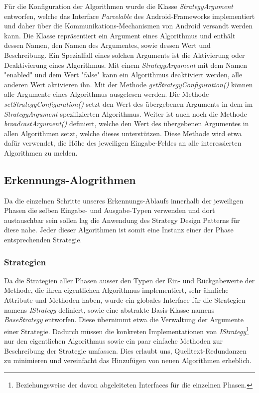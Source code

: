 \label{lbl_be_enable}Für die Konfiguration der Algorithmen wurde die Klasse \emph{StrategyArgument} entworfen, welche das Interface \emph{Parcelable} des Android-Frameworks implementiert und daher über die Kommunikations-Mechanismen von Android versandt werden kann. Die Klasse repräsentiert ein Argument eines Algorithmus und enthält dessen Namen, den Namen des Argumentes, sowie dessen Wert und Beschreibung. Ein Spezialfall eines solchen Arguments ist die Aktivierung oder Deaktivierung eines Algorithmus. Mit einem \emph{StrategyArgument} mit dem Namen "enabled" und dem Wert "false" kann ein Algorithmus deaktiviert werden, alle anderen Wert aktivieren ihn. Mit der Methode \emph{getStrategyConfiguration()} können alle Argumente eines Algorithmus ausgelesen werden. Die Methode \emph{setStrategyConfiguration()} setzt den Wert des übergebenen Arguments in dem im \emph{StrategyArgument} spezifizierten Algorithmus. Weiter ist auch noch die Methode \emph{broadcastArgument()} definiert, welche den Wert des übergebenen Argumentes in allen Algorithmen setzt, welche dieses unterstützen. Diese Methode wird etwa dafür verwendet, die Höhe des jeweiligen Eingabe-Feldes an alle interessierten Algorithmen zu melden.

\subsection{Erkennungs-Alogrithmen}

Da die einzelnen Schritte unseres Erkennungs-Ablaufs innerhalb der jeweiligen Phasen die selben Eingabe- und Ausgabe-Typen verwenden und dort austauschbar sein sollen lag die Anwendung des Strategy Design Patterns\cite[S.315-323]{designpatterns} für diese nahe. Jeder dieser Algorithmen ist somit eine Instanz einer der Phase entsprechenden Strategie.

\subsubsection{Strategien}

Da die Strategien aller Phasen ausser den Typen der Ein- und Rückgabewerte der Methode, die ihren eigentlichen Algorithmus implementiert, sehr ähnliche Attribute und Methoden haben, wurde ein globales Interface für die Strategien namens \emph{IStrategy} definiert, sowie eine abstrakte Basis-Klasse namens \emph{BaseStrategy} entworfen. Diese übernimmt etwa die Verwaltung der Argumente einer Strategie. Dadurch müssen die konkreten Implementationen von \emph{IStrategy}\footnote{Beziehungsweise der davon abgeleiteten Interfaces für die einzelnen Phasen.} nur den eigentlichen Algorithmus sowie ein paar einfache Methoden zur Beschreibung der Strategie umfassen. Dies erlaubt uns, Quelltext-Redundanzen zu minimieren und vereinfacht das Hinzufügen von neuen Algorithmen erheblich.

